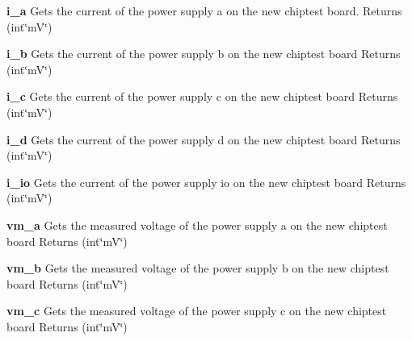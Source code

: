 \begin{DoxyItemize}
\item {\bfseries i\_\-a} Gets the current of the power supply a on the new chiptest board. {\ttfamily Returns} {\ttfamily }(int\char`\"{}mV\char`\"{})
\end{DoxyItemize}


\begin{DoxyItemize}
\item {\bfseries i\_\-b} Gets the current of the power supply b on the new chiptest board {\ttfamily Returns} {\ttfamily }(int\char`\"{}mV\char`\"{})
\end{DoxyItemize}


\begin{DoxyItemize}
\item {\bfseries i\_\-c} Gets the current of the power supply c on the new chiptest board {\ttfamily Returns} {\ttfamily }(int\char`\"{}mV\char`\"{})
\end{DoxyItemize}


\begin{DoxyItemize}
\item {\bfseries i\_\-d} Gets the current of the power supply d on the new chiptest board {\ttfamily Returns} {\ttfamily }(int\char`\"{}mV\char`\"{})
\end{DoxyItemize}


\begin{DoxyItemize}
\item {\bfseries i\_\-io} Gets the current of the power supply io on the new chiptest board {\ttfamily Returns} {\ttfamily }(int\char`\"{}mV\char`\"{})
\end{DoxyItemize}


\begin{DoxyItemize}
\item {\bfseries vm\_\-a} Gets the measured voltage of the power supply a on the new chiptest board {\ttfamily Returns} {\ttfamily }(int\char`\"{}mV\char`\"{})
\end{DoxyItemize}


\begin{DoxyItemize}
\item {\bfseries vm\_\-b} Gets the measured voltage of the power supply b on the new chiptest board {\ttfamily Returns} {\ttfamily }(int\char`\"{}mV\char`\"{})
\end{DoxyItemize}


\begin{DoxyItemize}
\item {\bfseries vm\_\-c} Gets the measured voltage of the power supply c on the new chiptest board {\ttfamily Returns} {\ttfamily }(int\char`\"{}mV\char`\"{})
\end{DoxyItemize}


